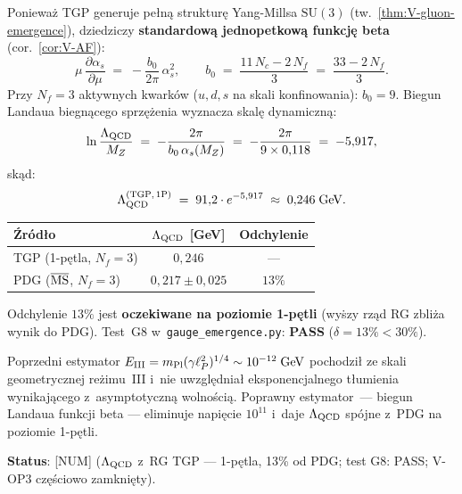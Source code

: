 \begin{proposition}%
\label{prop:V-LambdaQCD-RG}
Poniewa\.z TGP generuje pe\l{}n\k{a} struktur\k{e} Yang-Millsa
$\mathrm{SU}(3)$ (tw.~\ref{thm:V-gluon-emergence}), dziedziczy
\textbf{standardow\k{a} jednopetkow\k{a} funkcj\k{e} beta}
(cor.~\ref{cor:V-AF}):
\begin{equation}
  \mu\,\frac{\partial\alpha_s}{\partial\mu}
  \;=\; -\frac{b_0}{2\pi}\,\alpha_s^2,
  \qquad
  b_0 \;=\; \frac{11\,N_c - 2\,N_f}{3}
  \;=\; \frac{33 - 2\,N_f}{3}.
\end{equation}
Przy $N_f = 3$ aktywnych kwark\'ow ($u,d,s$ na skali konfinowania):
$b_0 = 9$.
Biegun Landaua biegn\k{a}cego sprz\k{e}\.zenia wyznacza skal\k{e}
dynamiczn\k{a}:
\begin{equation}\label{eq:V-LambdaQCD}
  \ln\frac{\Lambda_{\rm QCD}}{M_Z}
  \;=\; -\frac{2\pi}{b_0\,\alpha_s(M_Z)}
  \;=\; -\frac{2\pi}{9\times 0{,}118}
  \;=\; -5{,}917,
\end{equation}
sk\k{a}d:
\begin{equation}\label{eq:V-LambdaQCD-val}
  \Lambda_{\rm QCD}^{\rm (TGP,\,1P)}
  \;=\; 91{,}2 \cdot e^{-5{,}917}
  \;\approx\; 0{,}246\;\mathrm{GeV}.
\end{equation}

\begin{center}
\begin{tabular}{lcc}
\toprule
\'{Z}r\'od\l{}o & $\Lambda_{\rm QCD}$ [GeV] & Odchylenie \\
\midrule
TGP (1-p\k{e}tla, $N_f=3$) & $0{,}246$ & --- \\
PDG ($\overline{\rm MS}$, $N_f=3$) & $0{,}217 \pm 0{,}025$ & $13\%$ \\
\bottomrule
\end{tabular}
\end{center}

Odchylenie $13\%$ jest \textbf{oczekiwane na poziomie 1-p\k{e}tli}
(wy\.szy rz\k{a}d RG zbli\.za wynik do PDG).
Test~G8 w~\texttt{gauge\_emergence.py}: \textbf{PASS} ($\delta = 13\%
< 30\%$).

\begin{remark}%
\label{rem:V-G8-old}
Poprzedni estymator $E_{\rm III} = m_{\rm Pl}(\gamma\ell_P^2)^{1/4}
\sim 10^{-12}\;\mathrm{GeV}$ pochodzi\l{} ze skali geometrycznej
re\.zimu~III i~nie uwzgl\k{e}dnia\l{} eksponencjalnego t\l{}umienia
wynikaj\k{a}cego z~asymptotyczn\k{a} wolno\'sci\k{a}.
Poprawny estymator~--- biegun Landaua funkcji beta --- eliminuje
napięcie $10^{11}$ i~daje $\Lambda_{\rm QCD}$ sp\'ojne z~PDG
na poziomie 1-p\k{e}tli.
\end{remark}

\textbf{Status}:  [NUM]
($\Lambda_{\rm QCD}$ z~RG TGP --- 1-p\k{e}tla, 13\% od PDG;
test G8: PASS; V-OP3 cz\k{e}\'{s}ciowo zamkni\k{e}ty).
\end{proposition}

